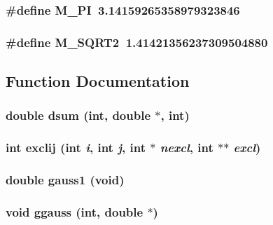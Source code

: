 \subsubsection{\setlength{\rightskip}{0pt plus 5cm}\#define M\_\-PI~3.14159265358979323846}\label{utils_8c_e71449b1cc6e6250b91f539153a7a0d3}


\subsubsection{\setlength{\rightskip}{0pt plus 5cm}\#define M\_\-SQRT2~1.41421356237309504880}\label{utils_8c_66b3ab30f1332874326ed93969e496e0}




\subsection{Function Documentation}
\subsubsection{\setlength{\rightskip}{0pt plus 5cm}double dsum (int, double $\ast$, int)}\label{utils_8c_58215ea5487474689b40ded6270509c9}


\subsubsection{\setlength{\rightskip}{0pt plus 5cm}int exclij (int {\em i}, int {\em j}, int $\ast$ {\em nexcl}, int $\ast$$\ast$ {\em excl})}\label{utils_8c_ce91782432810b76fa5e579bdf4d23f0}


\subsubsection{\setlength{\rightskip}{0pt plus 5cm}double gauss1 (void)}\label{utils_8c_32c3422f56e103d76b89b767d2c5b9c8}


\subsubsection{\setlength{\rightskip}{0pt plus 5cm}void ggauss (int, double $\ast$)}\label{utils_8c_416b6ade7409ddaf94d1e0a3885dccc1}


